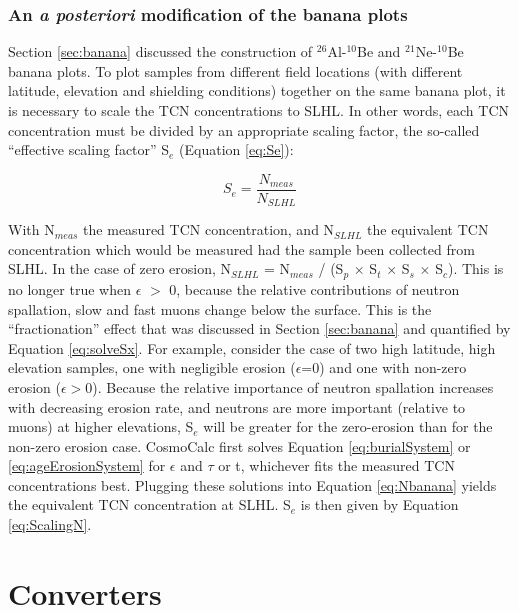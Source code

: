 \documentclass{article}
\begin{document}
\subsubsection{An {\it a posteriori} modification of the banana plots}\label{sec:Se}

Section    \ref{sec:banana}     discussed    the    construction    of
$^{26}$Al-$^{10}$Be  and $^{21}$Ne-$^{10}$Be  banana  plots.  To  plot
samples  from  different  field  locations (with  different  latitude,
elevation and shielding conditions)  together on the same banana plot,
it is  necessary to  scale the TCN  concentrations to SLHL.   In other
words,  each  TCN concentration  must  be  divided  by an  appropriate
scaling  factor,  the  so-called  ``effective scaling  factor''  S$_e$
(Equation \ref{eq:Se}):

\begin{equation}
  \label{eq:ScalingN}
  S_e = \frac{N_{meas}}{N_{SLHL}}
\end{equation}

With  N$_{meas}$ the  measured TCN  concentration, and  N$_{SLHL}$ the
equivalent TCN  concentration which would  be measured had  the sample
been collected from  SLHL.  In the case of  zero erosion, N$_{SLHL}$ =
N$_{meas}$  / (S$_p$ $\times$  S$_t$ $\times$  S$_s$ $\times$  S$_c$). 
This is  no longer  true when $\epsilon$  $>$ 0, because  the relative
contributions of neutron spallation,  slow and fast muons change below
the surface.  This is  the ``fractionation'' effect that was discussed
in    Section   \ref{sec:banana}    and    quantified   by    Equation
\ref{eq:solveSx}.   For  example,  consider   the  case  of  two  high
latitude,  high   elevation  samples,  one   with  negligible  erosion
($\epsilon$=0)  and  one   with  non-zero  erosion  ($\epsilon$$>$0).  
Because the  relative importance of neutron  spallation increases with
decreasing erosion rate, and  neutrons are more important (relative to
muons)  at   higher  elevations,  S$_e$   will  be  greater   for  the
zero-erosion  than for  the  non-zero erosion  case.  CosmoCalc  first
solves Equation \ref{eq:burialSystem} or \ref{eq:ageErosionSystem} for
$\epsilon$  and   $\tau$  or  t,  whichever  fits   the  measured  TCN
concentrations   best.   Plugging   these   solutions  into   Equation
\ref{eq:Nbanana}  yields the  equivalent  TCN concentration  at SLHL.  
S$_e$ is then given by Equation \ref{eq:ScalingN}.

\section{Converters}\label{sec:converter}
\end{document}
